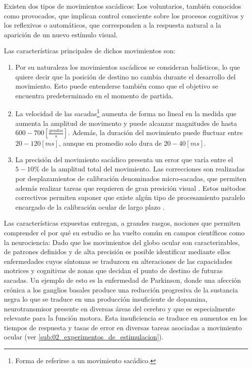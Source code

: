 \documentclass[../main.tex]{subfiles}
\begin{document}
		Existen dos tipos de movimientos sacádicos: Los voluntarios, también conocidos como provocados, que implican control consciente sobre los procesos cognitivos y los reflexivos o automáticos, que corresponden a la respuesta natural a la aparición de un nuevo estímulo visual.

		Las características principales de dichos movimientos son:
		\begin{enumerate}\setlength\itemsep{-0.5em}
			\item Por su naturaleza los movimientos sacádicos se consideran balísticos, lo que quiere decir que la posición de destino no cambia durante el desarrollo del movimiento. Esto puede entenderse también como que el objetivo se encuentra predeterminado en el momento de partida.

			\item La velocidad de las sacadas\footnote{Forma de referirse a un movimiento sacádico.} aumenta de forma no lineal en la medida que aumenta la amplitud de movimento y puede alcanzar magnitudes de hasta $600 - 700[\frac{grados}{s}]$. Además, la duración del movimiento puede fluctuar entre $20 - 120[ms]$, aunque en promedio solo dura de $20-40[ms]$. 

			\item La precisión del movimiento sacádico presenta un error que varía entre el $5-10\%$ de la amplitud total del movimiento. Las correcciones son realizadas por desplazamientos de calibración denominados micro-sacadas, que permiten además realizar tareas que requieren de gran presición visual \cite{article:movOcular4}. Estos métodos correctivos permiten suponer que existe algún tipo de procesamiento paralelo encargado de la calibración ocular de largo plazo \cite{article:movOcular2}.  

		\end{enumerate}

		Las características expuestas entregan, a grandes rasgos, nociones que permiten comprender el por qué su estudio se ha vuelto común en campos científicos como la neurociencia: Dado que los movimientos del globo ocular son caracterizables, de patrones definidos y de alta precisión es posible identificar mediante ellos enfermedades cuyos síntomas se traduzcen en alteraciones de las capacidades motrices y cognitivas de zonas que decidan el punto de destino de futuras sacadas. Un ejemplo de esto es la enfermedad de Parkinson, donde una afección crónica a los ganglios basales produce una reducción progresiva de la sustancia negra lo que se traduce en una producción insuficiente de dopamina, neurotransmisor presente en diversas áreas del cerebro y que es especialmente relevante para la función motora. Esta insuficiencia se traduce en aumentos en los tiempos de respuesta y tasas de error en diversas tareas asociadas a movimiento ocular \cite{article:tests_1, article:tests_2, article:tests_3, article:tests_4} (ver \ref{sub:02_experimentos_de_estimulacion}).    
\end{document}
